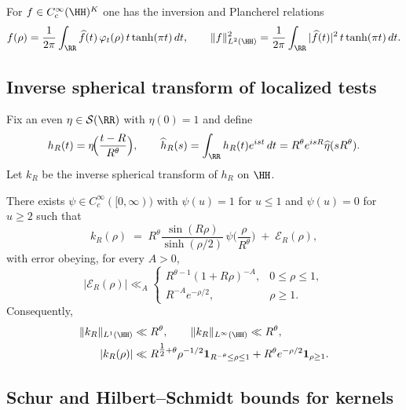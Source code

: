 \begin{lemma}\label{lem:planch}
For $f\in C_c^\infty(\HH)^K$ one has the inversion and Plancherel relations
\[
f(\rho) = \frac{1}{2\pi}\int_{\RR} \widehat f(t)\,\varphi_t(\rho)\, t\tanh(\pi t)\,dt,
\qquad
\|f\|_{L^2(\HH)}^2
= \frac{1}{2\pi}\int_{\RR} |\widehat f(t)|^2 \, t\tanh(\pi t)\,dt.
\]
\end{lemma}

\subsection{Inverse spherical transform of localized tests}
\label{app:aux:inv-transform}

Fix an even $\eta\in\mathcal{S}(\RR)$ with $\eta(0)=1$ and define
\[
h_R(t)=\eta\!\Big(\frac{t-R}{R^\theta}\Big),\qquad
\widehat h_R(s)=\int_{\RR} h_R(t)e^{i s t}\,dt
= R^\theta e^{i s R}\widehat\eta(sR^\theta).
\]
Let $k_R$ be the inverse spherical transform of $h_R$ on $\HH$.

\begin{lemma}\label{lem:kR-profile}
There exists $\psi\in C_c^\infty([0,\infty))$ with $\psi(u)=1$ for $u\le 1$
and $\psi(u)=0$ for $u\ge 2$ such that
\begin{equation}\label{eq:kR-asymp-app}
k_R(\rho) \;=\; R^\theta \frac{\sin(R\rho)}{\sinh(\rho/2)}\,\psi\!\Big(\frac{\rho}{R^\theta}\Big)
\;+\; \mathcal{E}_R(\rho),
\end{equation}
with error obeying, for every $A>0$,
\[
|\mathcal{E}_R(\rho)| \ll_A
\begin{cases}
R^{\theta-1}(1+R\rho)^{-A}, & 0\le \rho \le 1,\\[3pt]
R^{-\!A} e^{-\rho/2}, & \rho\ge 1.
\end{cases}
\]
Consequently,
\begin{align}
\|k_R\|_{L^1(\HH)} &\ll R^\theta, \qquad
\|k_R\|_{L^\infty(\HH)} \ll R^\theta, \label{eq:kr-norms}\\
|k_R(\rho)| &\ll R^{\tfrac12+\theta}\rho^{-1/2}\mathbf{1}_{R^{-\theta}\le \rho\le 1}
+ R^\theta e^{-\rho/2}\mathbf{1}_{\rho\ge 1}. \label{eq:kr-ptwise}
\end{align}
\end{lemma}

\subsection{Schur and Hilbert--Schmidt bounds for kernels}
\label{app:aux:schur}

